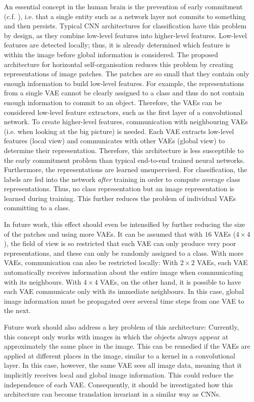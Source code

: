 An essential concept in the human brain is the prevention of early commitment (c.f. ), i.e. that a single entity such as a network layer not commits to something and then persists. Typical CNN architectures for classification have this problem by design, as they combine low-level features into higher-level features. Low-level features are detected locally; thus, it is already determined which feature is within the image before global information is considered. The proposed architecture for horizontal self-organisation reduces this problem by creating representations of image patches. The patches are so small that they contain only enough information to build low-level features. For example, the representations from a single VAE cannot be clearly assigned to a class and thus do not contain enough information to commit to an object. Therefore, the VAEs can be considered low-level feature extractors, such as the first layer of a convolutional network. To create higher-level features, communication with neighbouring VAEs (i.e. when looking at the big picture) is needed. Each VAE extracts low-level features (local view) and communicates with other VAEs (global view) to determine their representation. Therefore, this architecture is less susceptible to the early commitment problem than typical end-to-end trained neural networks.
Furthermore, the representations are learned unsupervised. For classification, the labels are fed into the network \emph{after} training in order to compute average class representations. Thus, no class representation but an image representation is learned during training. This further reduces the problem of individual VAEs committing to a class.

In future work, this effect should even be intensified by further reducing the size of the patches and using more VAEs. It can be assumed that with $16$ VAEs ($4\times4$), the field of view is so restricted that each VAE can only produce very poor representations, and these can only be randomly assigned to a class. With more VAEs, communication can also be restricted locally: With $2\times2$ VAEs, each VAE automatically receives information about the entire image when communicating with its neighbours. With $4\times4$ VAEs, on the other hand, it is possible to have each VAE communicate only with its immediate neighbours. In this case, global image information must be propagated over several time steps from one VAE to the next.

Future work should also address a key problem of this architecture: Currently, this concept only works with images in which the objects always appear at approximately the same place in the image. This can be remedied if the VAEs are applied at different places in the image, similar to a kernel in a convolutional layer. In this case, however, the same VAE sees all image data, meaning that it implicitly receives local and global image information. This could reduce the independence of each VAE. Consequently, it should be investigated how this architecture can become translation invariant in a similar way as CNNs.


